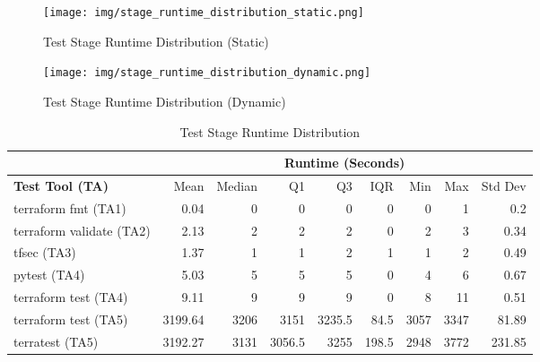 \begin{figure}[ht]
  \centering
  \texttt{[image: img/stage\_runtime\_distribution\_static.png]}
  \caption{Test Stage Runtime Distribution (Static)}
  \label{fig:stage_runtime_distribution_static}
\end{figure}

\begin{figure}[ht]
  \centering
  \texttt{[image: img/stage\_runtime\_distribution\_dynamic.png]}
  \caption{Test Stage Runtime Distribution (Dynamic)}
  \label{fig:stage_runtime_distribution_dynamic}
\end{figure}

\begin{table}[h!]
  \begin{tabular}{|l|r|r|r|r|r|r|r|r|}
    \hline
    & \multicolumn{8}{c|}{\textbf{Runtime (Seconds)}} \\
    \hline
    \textbf{Test Tool (TA)} & Mean & Median & Q1 & Q3 & IQR & Min & Max & Std Dev \\
    \hline
    terraform fmt (TA1) & 0.04 & 0 & 0 & 0 & 0 & 0 & 1 & 0.2 \\
    \hline
    terraform validate (TA2) & 2.13 & 2 & 2 & 2 & 0 & 2 & 3 & 0.34 \\
    \hline
    tfsec (TA3) & 1.37 & 1 & 1 & 2 & 1 & 1 & 2 & 0.49 \\
    \hline
    pytest (TA4) & 5.03 & 5 & 5 & 5 & 0 & 4 & 6 & 0.67 \\
    \hline
    terraform test (TA4) & 9.11 & 9 & 9 & 9 & 0 & 8 & 11 & 0.51 \\
    \hline
    terraform test (TA5) & 3199.64 & 3206 & 3151 & 3235.5 & 84.5 & 3057 & 3347 & 81.89 \\
    \hline
    terratest (TA5) & 3192.27 & 3131 & 3056.5 & 3255 & 198.5 & 2948 & 3772 & 231.85 \\
    \hline
  \end{tabular}
  \caption{Test Stage Runtime Distribution}
  \label{tab:stage_runtime_distribution}
\end{table}
